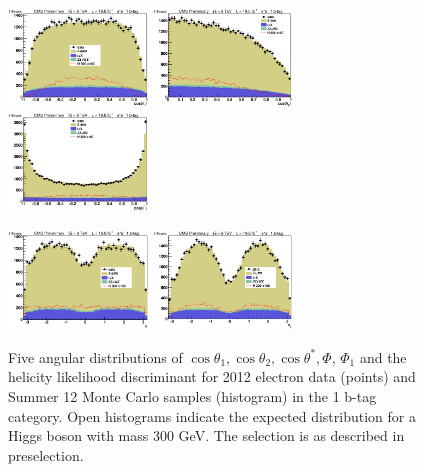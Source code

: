 \begin{figure}[thb!]
\centerline{
\includegraphics[width=0.33\textwidth]{presentation/defense/images/preselection/1/el/costheta1.eps}
\includegraphics[width=0.33\textwidth]{presentation/defense/images/preselection/1/el/costheta2.eps}
\includegraphics[width=0.33\textwidth]{presentation/defense/images/preselection/1/el/costhetast.eps}
}
\centerline{
\includegraphics[width=0.33\textwidth]{presentation/defense/images/preselection/1/el/phi.eps}
\includegraphics[width=0.33\textwidth]{presentation/defense/images/preselection/1/el/phi1.eps}
}
\caption{
Five angular distributions of $\cos\theta_1, \cos\theta_2, \cos\theta^*, \Phi$, $\Phi_1$ and the helicity likelihood discriminant for 2012 electron data (points) and Summer 12 Monte Carlo samples (histogram) in the 1 b-tag category.  Open histograms indicate the expected distribution for a Higgs boson with mass 300 GeV. The selection is as described in preselection.
\label{helicityDistDataMCE1}}
\end{figure}
